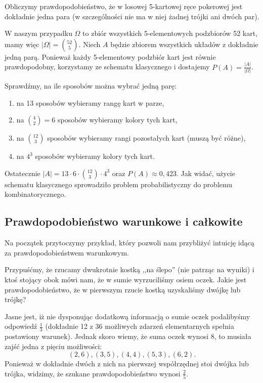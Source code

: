 \begin{example}
    Obliczymy prawdopodobieństwo, że w losowej 5-kartowej ręce pokerowej jest dokładnie jedna para (w szczególności nie ma w niej żadnej trójki ani dwóch par).
    
    W naszym przypadku $\Omega$ to zbiór wszystkich 5-elementowych podzbiorów 52 kart, mamy więc $|\Omega| = \binom{52}{5}$. Niech $A$ będzie zbiorem wszystkich układów z dokładnie jedną parą. Ponieważ każdy 5-elementowy podzbiór kart jest równie prawdopodobny, korzystamy ze schematu klasycznego i dostajemy $P(A)=\frac{|A|}{|\Omega|}$.
    
    Sprawdźmy, na ile sposobów można wybrać jedną parę:
    \begin{enumerate}
        \item na 13 sposobów wybieramy rangę kart w parze,
        \item na $\binom{4}{2}=6$ sposobów wybieramy kolory tych kart,
        \item na $\binom{12}{3}$ sposobów wybieramy rangi pozostałych kart (muszą być różne),
        \item na $4^3$ sposobów wybieramy kolory tych kart.
    \end{enumerate}
    Ostatecznie $|A|=13\cdot6\cdot\binom{12}{3}\cdot4^3$ oraz $P(A)\approx0,423$. Jak widać, użycie schematu klasycznego sprowadziło problem probabilistyczny do problemu kombinatorycznego.
\end{example}

\subsection{Prawdopodobieństwo warunkowe i całkowite}

Na początek przytoczymy przykład, który pozwoli nam przybliżyć intuicję idącą za prawdopodobieństwem warunkowym. 

Przypuśćmy, że rzucamy dwukrotnie kostką ,,na ślepo'' (nie patrząc na wyniki) i ktoś stojący obok mówi nam, że w sumie wyrzuciliśmy osiem oczek. Jakie jest prawdopodobieństwo, że w pierwszym rzucie kostką uzyskaliśmy dwójkę lub trójkę?

Jasne jest, iż nie dysponując dodatkową informacją o sumie oczek podalibyśmy odpowiedź $\frac{1}{3}$ (dokładnie 12 z 36 możliwych zdarzeń elementarnych spełnia postawiony warunek). Jednak skoro wiemy, że suma oczek wynosi 8, to musiała zajść jedna z pięciu możliwości:
$$(2, 6), (3, 5), (4, 4), (5, 3), (6, 2).$$
Ponieważ w dokładnie dwóch z nich na pierwszej współrzędnej stoi dwójka lub trójka, widzimy, że szukane prawdopodobieństwo wynosi $\frac{2}{5}$.

